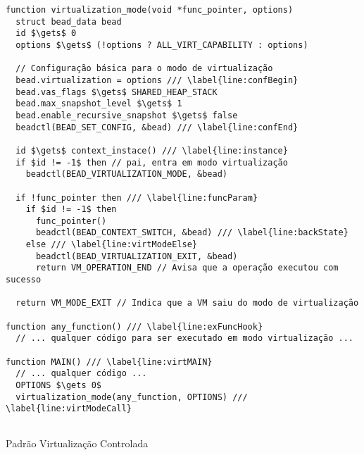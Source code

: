 \begin{pseudocode}
\begin{lstlisting}[language=pseudocode, style=pseudocode]
function virtualization_mode(void *func_pointer, options)
  struct bead_data bead
  id $\gets$ 0
  options $\gets$ (!options ? ALL_VIRT_CAPABILITY : options)

  // Configuração básica para o modo de virtualização
  bead.virtualization = options /// \label{line:confBegin}
  bead.vas_flags $\gets$ SHARED_HEAP_STACK
  bead.max_snapshot_level $\gets$ 1
  bead.enable_recursive_snapshot $\gets$ false
  beadctl(BEAD_SET_CONFIG, &bead) /// \label{line:confEnd}

  id $\gets$ context_instace() /// \label{line:instance}
  if $id != -1$ then // pai, entra em modo virtualização
    beadctl(BEAD_VIRTUALIZATION_MODE, &bead)

  if !func_pointer then /// \label{line:funcParam}
    if $id != -1$ then
      func_pointer()
      beadctl(BEAD_CONTEXT_SWITCH, &bead) /// \label{line:backState}
    else /// \label{line:virtModeElse}
      beadctl(BEAD_VIRTUALIZATION_EXIT, &bead)
      return VM_OPERATION_END // Avisa que a operação executou com sucesso

  return VM_MODE_EXIT // Indica que a VM saiu do modo de virtualização

function any_function() /// \label{line:exFuncHook}
  // ... qualquer código para ser executado em modo virtualização ...      

function MAIN() /// \label{line:virtMAIN}
  // ... qualquer código ...
  OPTIONS $\gets 0$
  virtualization_mode(any_function, OPTIONS) /// \label{line:virtModeCall}
  
\end{lstlisting}

  \caption{Padrão Virtualização Controlada}
  \label{alg:virtMode}
\end{pseudocode}
